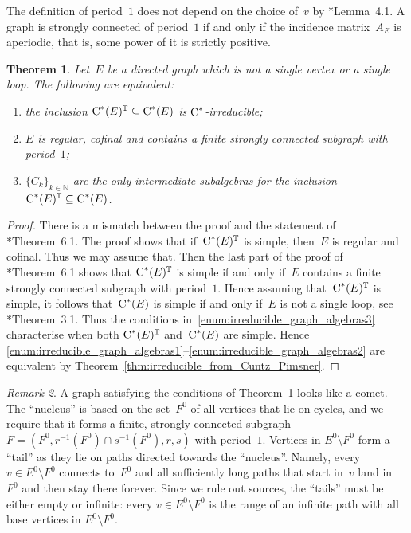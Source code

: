 \documentclass[a4paper]{amsart}
\theoremstyle{plain}
\newtheorem{theorem}{Theorem}
\theoremstyle{definition}
\theoremstyle{remark}
\newtheorem{remark}[theorem]{Remark}
\numberwithin{theorem}{section}
\numberwithin{equation}{section}
\newcommand*{\nb}{\nobreakdash}
\newcommand*{\N}{\mathbb N}
\newcommand*{\T}{\mathbb T}%
\newcommand*{\Cst}{\textup C^*}%
\newcommand*{\sr}{s}%
\newcommand*{\rg}{r}%
\begin{document}
The definition of period~\(1\) does not depend on the choice of~\(v\)
by \cite{Pask-Rho:simple_graph_core}*{Lemma~4.1}.
A graph is strongly connected of period~\(1\) if and only if the
incidence matrix~\(A_E\) is aperiodic, that is, some power of it is
strictly positive.

\begin{theorem}
  \label{thm:irreducible_graph_algebras}
  Let~\(E\) be a directed graph which is not a single vertex or a single loop.
  The following are equivalent:
  \begin{enumerate}
  \item \label{enum:irreducible_graph_algebras1}%
    the inclusion \(\Cst(E)^\T\subseteq \Cst(E)\) is
    \(\Cst\)\nb-irreducible;
  \item \label{enum:irreducible_graph_algebras3}%
    \(E\) is regular, cofinal and contains a finite strongly
    connected subgraph with period~\(1\);
  \item \label{enum:irreducible_graph_algebras2}%
    \(\{C_k\}_{k\in \N}\) are the only intermediate subalgebras for the
    inclusion \(\Cst(E)^\T\subseteq \Cst(E)\).
  \end{enumerate}
\end{theorem}

\begin{proof}
  There is a mismatch between the proof and the statement of
  \cite{Pask-Rho:simple_graph_core}*{Theorem~6.1}.
  The proof shows that if~\(\Cst(E)^\T\) is simple, then~\(E\) is
  regular and cofinal.
  Thus we may assume that.
  Then the last part of the proof of
  \cite{Pask-Rho:simple_graph_core}*{Theorem~6.1} shows that
  \(\Cst(E)^\T\) is simple if and only if~\(E\) contains a finite
  strongly connected subgraph with period~\(1\).
  Hence assuming that~\(\Cst(E)^\T\)  is simple, it follows
  that~\(\Cst(E)\) is simple if and only if~\(E\) is not a single
  loop, see \cite{Pask-Rho:simple_graph_core}*{Theorem~3.1}.
  Thus the conditions in~\ref{enum:irreducible_graph_algebras3}
  characterise when both \(\Cst(E)^\T\) and~\(\Cst(E)\) are simple.
  Hence
  \ref{enum:irreducible_graph_algebras1}--\ref{enum:irreducible_graph_algebras2}
  are equivalent by Theorem~\ref{thm:irreducible_from_Cuntz_Pimsner}.
\end{proof}

\begin{remark}
  A graph satisfying the conditions of
  Theorem~\ref{thm:irreducible_graph_algebras} looks like a comet.
  The ``nucleus'' is based on the set~\(F^0\) of all vertices that lie
  on cycles, and we require that it forms a finite, strongly connected
  subgraph \(F=(F^0, \rg^{-1}(F^0)\cap \sr^{-1}(F^0),\rg,\sr)\) with
  period~\(1\).
  Vertices in \(E^0\setminus F^0\)  form a ``tail'' as they lie on paths directed towards the ``nucleus''.
  Namely, every \(v\in E^0\setminus F^0\)
  connects to~\(F^0\) and all sufficiently long paths that start
  in~\(v\) land in~\(F^0\) and then stay there forever.
  Since we rule out sources, the ``tails'' must be either empty or infinite:
  every \(v\in E^0\setminus F^0\) is the range of an infinite path
  with all base vertices in \(E^0\setminus F^0\).
\end{remark}
\end{document}
